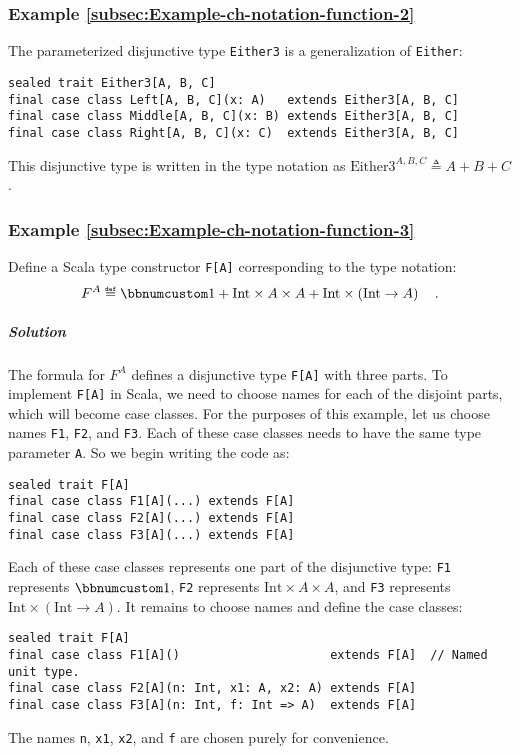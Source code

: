 \subsubsection{Example \label{subsec:Example-ch-notation-function-2}\ref{subsec:Example-ch-notation-function-2}}

The parameterized disjunctive type \lstinline!Either3! is a generalization
of \lstinline!Either!:
\begin{lstlisting}
sealed trait Either3[A, B, C]
final case class Left[A, B, C](x: A)   extends Either3[A, B, C]
final case class Middle[A, B, C](x: B) extends Either3[A, B, C]
final case class Right[A, B, C](x: C)  extends Either3[A, B, C]
\end{lstlisting}
This disjunctive type is written in the type notation as $\text{Either3}^{A,B,C}\triangleq A+B+C$.

\subsubsection{Example \label{subsec:Example-ch-notation-function-3}\ref{subsec:Example-ch-notation-function-3}}

Define a Scala type constructor \lstinline!F[A]! corresponding to
the type notation:
\[
F^{A}\triangleq\bbnum 1+\text{Int}\times A\times A+\text{Int}\times\left(\text{Int}\rightarrow A\right)\quad.
\]


\subparagraph{Solution}

The formula for $F^{A}$ defines a disjunctive type \lstinline!F[A]!
with three parts. To implement \lstinline!F[A]! in Scala, we need
to choose names for each of the disjoint parts, which will become
case classes. For the purposes of this example, let us choose names
\lstinline!F1!, \lstinline!F2!, and \lstinline!F3!. Each of these
case classes needs to have the same type parameter \lstinline!A!.
So we begin writing the code as:
\begin{lstlisting}
sealed trait F[A]
final case class F1[A](...) extends F[A]
final case class F2[A](...) extends F[A]
final case class F3[A](...) extends F[A]
\end{lstlisting}
Each of these case classes represents one part of the disjunctive
type: \lstinline!F1! represents $\bbnum 1$, \lstinline!F2! represents
$\text{Int}\times A\times A$, and \lstinline!F3! represents $\text{Int}\times\left(\text{Int}\rightarrow A\right)$.
It remains to choose names and define the case classes:
\begin{lstlisting}
sealed trait F[A]
final case class F1[A]()                     extends F[A]  // Named unit type.
final case class F2[A](n: Int, x1: A, x2: A) extends F[A]
final case class F3[A](n: Int, f: Int => A)  extends F[A]
\end{lstlisting}
The names \lstinline!n!, \lstinline!x1!, \lstinline!x2!, and \lstinline!f!
are chosen purely for convenience.

